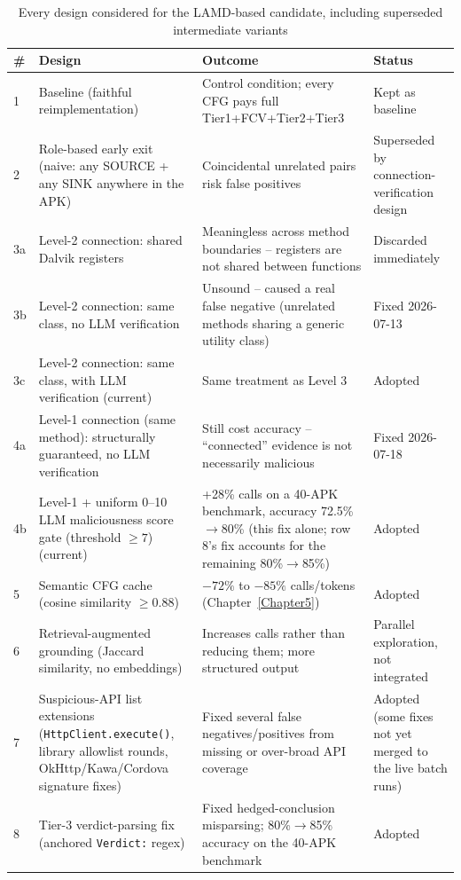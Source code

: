 \begin{table}[htbp]
\centering
\caption{Every design considered for the LAMD-based candidate, including
superseded intermediate variants}
\label{tab:design-history}
\footnotesize
\begin{tabularx}{\textwidth}{lXXl}
\toprule
\# & Design & Outcome & Status \\
\midrule
1 & Baseline (faithful reimplementation) & Control condition; every CFG pays full Tier1+FCV+Tier2+Tier3 & Kept as baseline \\
2 & Role-based early exit (naive: any SOURCE + any SINK anywhere in the APK) & Coincidental unrelated pairs risk false positives & Superseded by connection-verification design \\
3a & Level-2 connection: shared Dalvik registers & Meaningless across method boundaries -- registers are not shared between functions & Discarded immediately \\
3b & Level-2 connection: same class, no LLM verification & Unsound -- caused a real false negative (unrelated methods sharing a generic utility class) & Fixed 2026-07-13 \\
3c & Level-2 connection: same class, with LLM verification (current) & Same treatment as Level 3 & Adopted \\
4a & Level-1 connection (same method): structurally guaranteed, no LLM verification & Still cost accuracy -- ``connected'' evidence is not necessarily malicious & Fixed 2026-07-18 \\
4b & Level-1 + uniform 0--10 LLM maliciousness score gate (threshold $\geq7$) (current) & +28\% calls on a 40-APK benchmark, accuracy 72.5\%$\to$80\% (this fix alone; row 8's fix accounts for the remaining 80\%$\to$85\%) & Adopted \\
5 & Semantic CFG cache (cosine similarity $\geq0.88$) & $-72\%$ to $-85\%$ calls/tokens (Chapter~\ref{Chapter5}) & Adopted \\
6 & Retrieval-augmented grounding (Jaccard similarity, no embeddings) & Increases calls rather than reducing them; more structured output & Parallel exploration, not integrated \\
7 & Suspicious-API list extensions (\texttt{HttpClient.execute()}, library allowlist rounds, OkHttp/Kawa/Cordova signature fixes) & Fixed several false negatives/positives from missing or over-broad API coverage & Adopted (some fixes not yet merged to the live batch runs) \\
8 & Tier-3 verdict-parsing fix (anchored \texttt{Verdict:} regex) & Fixed hedged-conclusion misparsing; 80\%$\to$85\% accuracy on the 40-APK benchmark & Adopted \\
\bottomrule
\end{tabularx}
\end{table}

